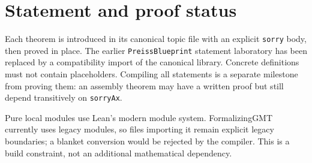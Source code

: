 \section{Statement and proof status}
Each theorem is introduced in its canonical topic file with an explicit
\texttt{sorry} body, then proved in place. The earlier \texttt{PreissBlueprint} statement laboratory has been replaced by
a compatibility import of the canonical library.
Concrete definitions must not contain placeholders. Compiling all statements
is a separate milestone from proving them: an assembly theorem may have a
written proof but still depend transitively on \texttt{sorryAx}.

Pure local modules use Lean's modern module system. FormalizingGMT currently
uses legacy modules, so files importing it remain explicit legacy boundaries;
a blanket conversion would be rejected by the compiler. This is a build
constraint, not an additional mathematical dependency.
